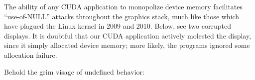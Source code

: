 \documentclass[letterpaper,10pt]{article}
\makeatletter
\newenvironment{figurehere}
{\def\@captype{figure}}
{}
\makeatother
\begin{document}
\begin{multicols}{2}
The ability of any CUDA application to monopolize device memory facilitates
``use-of-NULL'' attacks throughout the graphics stack, much like those which have plagued
the Linux kernel in 2009 and 2010. Below, see two corrupted displays. It is doubtful that
our CUDA application actively molested the display, since it simply allocated
device memory; more likely, the programs ignored some allocation failure.

Behold the grim visage of undefined behavior:

\begin{figurehere}
\centering
{}
\end{figurehere}

\end{multicols}
\end{document}
